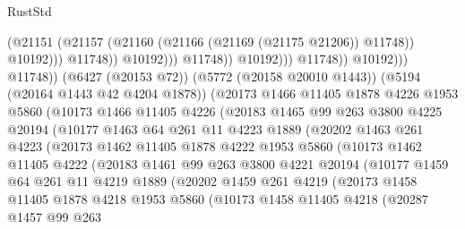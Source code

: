 \begin{lexlean}{RustStd}
\begin{coremodule}
                                            (@21151
                                              (@21157
                                                (@21160 (@21166 (@21169 (@21175 @21206)) @11748))
                                                @10192)))
                                          @11748))
                                      @10192)))
                                @11748))
                            @10192)))
                      @11748))
                  @10192)))
            @11748))
        (@6427 (@20153 @72))
        (@5772 (@20158 @20010 @1443))
        (@5194 (@20164 @1443 @42 @4204 @1878))
        (@20173
          @1466
          @11405
          @1878
          @4226
          @1953
          @5860
          (@10173
            @1466
            @11405
            @4226
            (@20183
              @1465
              @99
              @263
              @3800
              @4225
              @20194
              (@10177
                @1463
                @64
                @261
                @11
                @4223
                @1889
                (@20202
                  @1463
                  @261
                  @4223
                  (@20173
                    @1462
                    @11405
                    @1878
                    @4222
                    @1953
                    @5860
                    (@10173
                      @1462
                      @11405
                      @4222
                      (@20183
                        @1461
                        @99
                        @263
                        @3800
                        @4221
                        @20194
                        (@10177
                          @1459
                          @64
                          @261
                          @11
                          @4219
                          @1889
                          (@20202
                            @1459
                            @261
                            @4219
                            (@20173
                              @1458
                              @11405
                              @1878
                              @4218
                              @1953
                              @5860
                              (@10173
                                @1458
                                @11405
                                @4218
                                (@20287
                                  @1457
                                  @99
                                  @263

\end{coremodule}
\end{lexlean}
